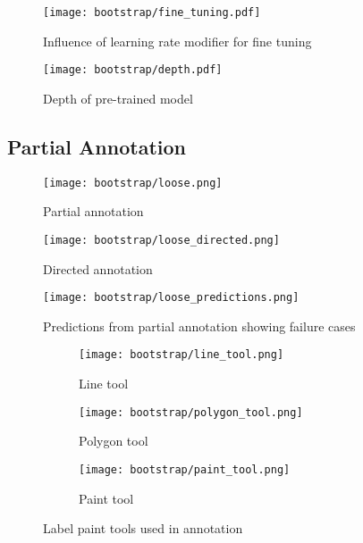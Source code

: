 \begin{figure*}[!ht]
\centering
\begin{subfigure}{.5\textwidth}
  \centering
  \texttt{[image: bootstrap/fine\_tuning.pdf]}
  \caption{Influence of learning rate modifier for fine tuning}  
  \label{fig:fine}
\end{subfigure}%
\begin{subfigure}{.5\textwidth}
  \centering
  \texttt{[image: bootstrap/depth.pdf]}
  \caption{Depth of pre-trained model}  
  \label{fig:depth}
\end{subfigure}

\label{fig:training}
\end{figure*}




\subsection {Partial Annotation}


\begin{figure*}[!ht]
\centering
\begin{subfigure}[t]{.3\textwidth}
  \centering
  \texttt{[image: bootstrap/loose.png]}
  \caption{Partial annotation}
  \label{fig:loose_annot}
\end{subfigure}%
\begin{subfigure}[t]{.3\textwidth}
  \centering
  \texttt{[image: bootstrap/loose\_directed.png]}
  \caption{Directed annotation}
  \label{fig:loose_dir}

\end{subfigure}%
\begin{subfigure}[t]{.3\textwidth}
  \centering
  \texttt{[image: bootstrap/loose\_predictions.png]}
  \caption{Predictions from partial annotation showing failure cases}
  \label{fig:loose_pred}
\end{subfigure}
  \caption{Loose annotation methods, red overlay refers to pixels labelled as background where transparent pixels are unlabelled}


\end{figure*}

\begin{figure}
\centering
\begin{subfigure}[t]{.15\textwidth}
  \centering
  \texttt{[image: bootstrap/line\_tool.png]}
  \caption{Line tool}
\end{subfigure}%
\begin{subfigure}[t]{.15\textwidth}
  \centering
  \texttt{[image: bootstrap/polygon\_tool.png]}
  \caption{Polygon tool}
\end{subfigure}%
\begin{subfigure}[t]{.15\textwidth}
  \centering
  \texttt{[image: bootstrap/paint\_tool.png]}
  \caption{Paint tool}
\end{subfigure}%

  \caption{Label paint tools used in annotation}
  \label{fig:tools}

\end{figure}



